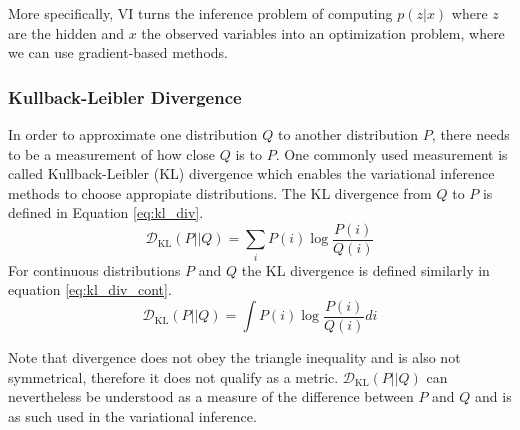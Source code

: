 More specifically, VI turns the inference problem of computing $p(z|x)$ where $z$ are the hidden and $x$ the observed variables into an optimization problem, where we can use gradient-based methods.


\subsubsection{Kullback-Leibler Divergence}
In order to approximate one distribution $Q$ to another distribution $P$, there needs to be a measurement of how close $Q$ is to $P$.
One commonly used measurement is called Kullback-Leibler (KL) divergence\cite{kl_div:1951} which enables the variational inference methods to choose appropiate distributions.
The KL divergence from $Q$ to $P$ is defined in Equation \ref{eq:kl_div}.
\begin{equation}
  \label{eq:kl_div_disc}
  \mathcal{D}_{\mathrm{KL}}(P || Q) = \sum_{i} P(i) \log \frac{P(i)}{Q(i)}
\end{equation}
For continuous distributions $P$ and $Q$ the KL divergence is defined similarly in equation \ref{eq:kl_div_cont}.
\begin{equation}
  \label{eq:kl_div_cont}
  \mathcal{D}_{\mathrm{KL}}(P || Q) = \int P(i) \log \frac{P(i)}{Q(i)} di
\end{equation}


Note that divergence does not obey the triangle inequality and is also not symmetrical, therefore it does not qualify as a metric.
$\mathcal{D}_{\mathrm{KL}}(P||Q)$ can nevertheless be understood as a measure of the difference between $P$ and $Q$ and is as such used in the variational inference.


\newpage





